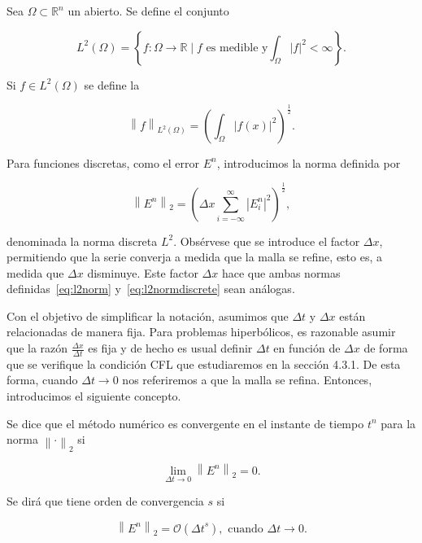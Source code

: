 \begin{definition}
  Sea $\Omega\subset\mathbb{R}^{n}$ un abierto.
  Se define el conjunto

  \begin{equation*}
    L^{2}\left(\Omega\right)=
    \left\{
    f\colon\Omega\to\mathbb{R}\mid
    f\text{ es medible y}
    \int_{\Omega}\left|f\right|^{2}<\infty
    \right\}.
  \end{equation*}

  Si $f\in L^{2}\left(\Omega\right)$ se define la

  \begin{equation}\label{eq:l2norm}
    {\left\|f\right\|}_{L^{2}\left(\Omega\right)}=
      {\left(
        \int_{\Omega}
        \left|f\left(x\right)\right|^{2}
        \right)}^{\frac{1}{2}}.
  \end{equation}
\end{definition}

Para funciones discretas, como el error $E^{n}$, introducimos la
norma definida por

\begin{equation}\label{eq:l2normdiscrete}
  {\left\|E^{n}\right\|}_{2}=
    {
      \left(
      \Delta x
      \sum_{i=-\infty}^{\infty}
      {\left|E^{n}_{i}\right|}^{2}
      \right)
    }^{\frac{1}{2}},
\end{equation}

denominada la norma discreta $L^{2}$.
Obsérvese que se introduce el factor $\Delta x$, permitiendo que la
serie converja a medida que la malla se refine, esto es, a medida que
$\Delta x$ disminuye.
Este factor $\Delta x$ hace que ambas normas definidas~\eqref{eq:l2norm}
y~\eqref{eq:l2normdiscrete} sean análogas.

Con el objetivo de simplificar la notación, asumimos que $\Delta t$ y
$\Delta x$ están relacionadas de manera fija.
Para problemas hiperbólicos, es razonable asumir que la razón
\begin{math}
  \frac{\Delta x}{\Delta t}
\end{math}
es fija y de hecho es usual definir $\Delta t$ en función de
$\Delta x$ de forma que se verifique la condición CFL que
estudiaremos en la sección 4.3.1.
De esta forma, cuando $\Delta t\to 0$ nos referiremos a que la malla
se refina.
Entonces, introducimos el siguiente concepto.

\begin{definition}
  Se dice que el método numérico es convergente en el instante de
  tiempo $t^{n}$ para la norma ${\left\|\cdot\right\|}_{2}$ si

  \begin{equation*}
    \lim_{\Delta t\to0}
    {\left\|E^{n}\right\|}_{2}=
    0.
  \end{equation*}

  Se dirá que tiene orden de convergencia $s$ si

  \begin{equation*}
    \left\|
    E^{n}
    \right\|_{2}=
    \mathcal{O}
    \left({\Delta t}^{s}\right),
    \text{ cuando }
    \Delta t\to 0.
  \end{equation*}
\end{definition}

